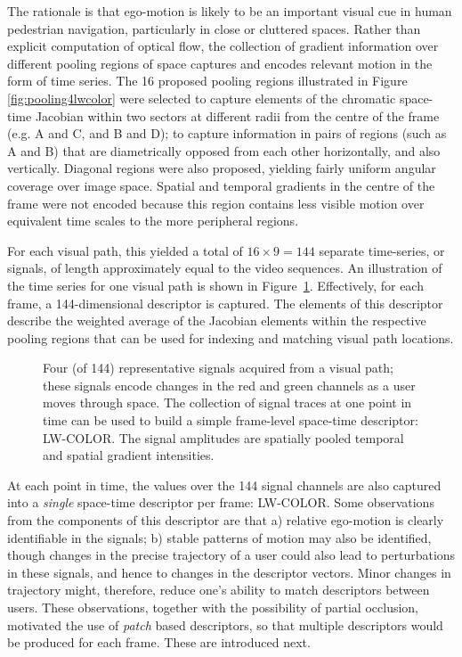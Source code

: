 The rationale is that ego-motion is likely to be an important visual cue in human pedestrian navigation, particularly in close or cluttered spaces. Rather than explicit computation of optical flow, the collection of gradient information over different pooling regions of space captures and encodes relevant motion in the form of time series.  The 16 proposed pooling regions illustrated in Figure \ref{fig:pooling4lwcolor} were selected to capture elements of the chromatic space-time Jacobian within two sectors at different radii from the centre of the frame (e.g. A and C, and B and D); to capture information in pairs of regions (such as A and B) that are diametrically opposed from each other horizontally, and also vertically.  Diagonal regions were also proposed, yielding fairly uniform angular coverage over image space. Spatial and temporal gradients in the centre of the frame were not encoded because this region contains less visible motion over equivalent time scales to the more peripheral regions.  


For each visual path, this yielded a total of $16\times 9 = 144$ separate time-series, or signals, of length approximately equal to the video sequences.  An illustration of the time series for one visual path is shown in Figure~\ref{fig:Traces}. Effectively, for each frame, a 144-dimensional descriptor is captured. The elements of this descriptor describe the weighted average of the Jacobian elements within the respective pooling regions that can be used for indexing and matching visual path locations.

\begin{figure}
\begin{center}
	\setlength{}
	\setlength{}
		
\caption{Four (of 144) representative signals acquired from a visual path; these signals encode changes in the red and green channels as a user moves through space.  The collection of signal traces at one point in time can be used to build a simple frame-level space-time descriptor: LW-COLOR. The signal amplitudes are spatially pooled temporal and spatial gradient intensities.}
\label{fig:Traces}
\end{center}
\end{figure}

At each point in time, the values over the 144 signal channels are also captured into a \textit{single} space-time descriptor per frame: LW-COLOR.  Some observations from the components of this descriptor are that a) relative ego-motion is clearly identifiable in the signals; b) stable patterns of motion may also be identified, though changes in the precise trajectory of a user could also lead to perturbations in these signals, and hence to changes in the descriptor vectors. Minor changes in trajectory might, therefore, reduce one's ability to match descriptors between users.  These observations, together with the possibility of partial occlusion, motivated the use of \textit{patch} based descriptors, so that multiple descriptors would be produced for each frame. These are introduced next.



